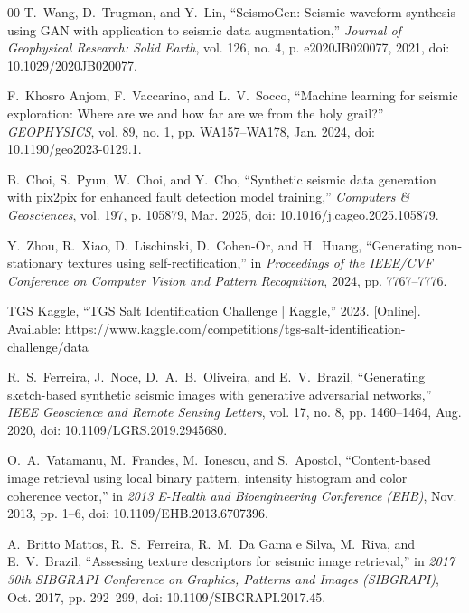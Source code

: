 \documentclass{ieeeaccess}
\begin{document}
\begin{thebibliography}{00}
T.~Wang, D.~Trugman, and Y.~Lin, ``SeismoGen: Seismic waveform synthesis using GAN with application to seismic data augmentation,'' \emph{Journal of Geophysical Research: Solid Earth}, vol. 126, no. 4, p. e2020JB020077, 2021, doi: 10.1029/2020JB020077.

F.~Khosro Anjom, F.~Vaccarino, and L.~V.~Socco, ``Machine learning for seismic exploration: Where are we and how far are we from the holy grail?'' \emph{GEOPHYSICS}, vol. 89, no. 1, pp. WA157--WA178, Jan. 2024, doi: 10.1190/geo2023-0129.1.

B.~Choi, S.~Pyun, W.~Choi, and Y.~Cho, ``Synthetic seismic data generation with pix2pix for enhanced fault detection model training,'' \emph{Computers \& Geosciences}, vol. 197, p. 105879, Mar. 2025, doi: 10.1016/j.cageo.2025.105879.

Y.~Zhou, R.~Xiao, D.~Lischinski, D.~Cohen-Or, and H.~Huang, ``Generating non-stationary textures using self-rectification,'' in \emph{Proceedings of the IEEE/CVF Conference on Computer Vision and Pattern Recognition}, 2024, pp. 7767--7776.

TGS Kaggle, ``TGS Salt Identification Challenge | Kaggle,'' 2023. [Online]. Available: https://www.kaggle.com/competitions/tgs-salt-identification-challenge/data

R.~S.~Ferreira, J.~Noce, D.~A.~B.~Oliveira, and E.~V.~Brazil, ``Generating sketch-based synthetic seismic images with generative adversarial networks,'' \emph{IEEE Geoscience and Remote Sensing Letters}, vol. 17, no. 8, pp. 1460--1464, Aug. 2020, doi: 10.1109/LGRS.2019.2945680.

O.~A.~Vatamanu, M.~Frandes, M.~Ionescu, and S.~Apostol, ``Content-based image retrieval using local binary pattern, intensity histogram and color coherence vector,'' in \emph{2013 E-Health and Bioengineering Conference (EHB)}, Nov. 2013, pp. 1--6, doi: 10.1109/EHB.2013.6707396.

A.~Britto Mattos, R.~S.~Ferreira, R.~M.~Da Gama e Silva, M.~Riva, and E.~V.~Brazil, ``Assessing texture descriptors for seismic image retrieval,'' in \emph{2017 30th SIBGRAPI Conference on Graphics, Patterns and Images (SIBGRAPI)}, Oct. 2017, pp. 292--299, doi: 10.1109/SIBGRAPI.2017.45.

\end{thebibliography}
\end{document}
